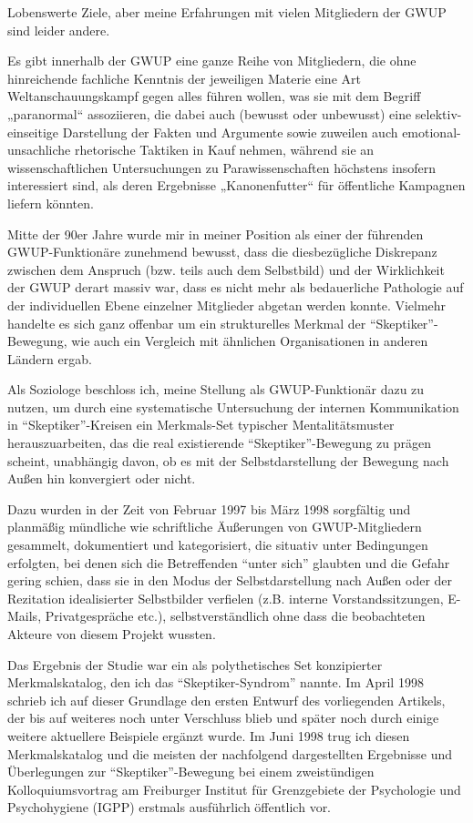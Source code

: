 Lobenswerte Ziele, aber meine Erfahrungen mit vielen Mitgliedern der
GWUP sind leider andere.

Es gibt innerhalb der GWUP eine ganze Reihe von Mitgliedern, die ohne
hinreichende fachliche Kenntnis der jeweiligen Materie eine Art
Weltanschauungskampf gegen alles führen wollen, was sie mit dem Begriff
„paranormal`` assoziieren, die dabei auch (bewusst oder unbewusst) eine
selektiv-einseitige Darstellung der Fakten und Argumente sowie zuweilen
auch emotional-unsachliche rhetorische Taktiken in Kauf nehmen, während
sie an wissenschaftlichen Untersuchungen zu Parawissenschaften höchstens
insofern interessiert sind, als deren Ergebnisse „Kanonenfutter`` für
öffentliche Kampagnen liefern könnten.

Mitte der 90er Jahre wurde mir in meiner Position als einer der
führenden GWUP-Funktionäre zunehmend bewusst, dass die diesbezügliche
Diskrepanz zwischen dem Anspruch (bzw. teils auch dem Selbstbild) und
der Wirklichkeit der GWUP derart massiv war, dass es nicht mehr als
bedauerliche Pathologie auf der individuellen Ebene einzelner Mitglieder
abgetan werden konnte. Vielmehr handelte es sich ganz offenbar um ein
strukturelles Merkmal der ``Skeptiker''-Bewegung, wie auch ein Vergleich
mit ähnlichen Organisationen in anderen Ländern ergab.

Als Soziologe beschloss ich, meine Stellung als GWUP-Funktionär dazu zu
nutzen, um durch eine systematische Untersuchung der internen
Kommunikation in ``Skeptiker''-Kreisen ein Merkmals-Set typischer
Mentalitätsmuster herauszuarbeiten, das die real existierende
``Skeptiker''-Bewegung zu prägen scheint, unabhängig davon, ob es mit
der Selbstdarstellung der Bewegung nach Außen hin konvergiert oder
nicht.

Dazu wurden in der Zeit von Februar 1997 bis März 1998 sorgfältig und
planmäßig mündliche wie schriftliche Äußerungen von GWUP-Mitgliedern
gesammelt, dokumentiert und kategorisiert, die situativ unter
Bedingungen erfolgten, bei denen sich die Betreffenden ``unter sich''
glaubten und die Gefahr gering schien, dass sie in den Modus der
Selbstdarstellung nach Außen oder der Rezitation idealisierter
Selbstbilder verfielen (z.B. interne Vorstandssitzungen, E-Mails,
Privatgespräche etc.), selbstverständlich ohne dass die beobachteten
Akteure von diesem Projekt wussten.

Das Ergebnis der Studie war ein als polythetisches Set konzipierter
Merkmalskatalog, den ich das ``Skeptiker-Syndrom'' nannte. Im April 1998
schrieb ich auf dieser Grundlage den ersten Entwurf des vorliegenden
Artikels, der bis auf weiteres noch unter Verschluss blieb und später
noch durch einige weitere aktuellere Beispiele ergänzt wurde. Im Juni
1998 trug ich diesen Merkmalskatalog und die meisten der nachfolgend
dargestellten Ergebnisse und Überlegungen zur ``Skeptiker''-Bewegung bei
einem zweistündigen Kolloquiumsvortrag am Freiburger Institut für
Grenzgebiete der Psychologie und Psychohygiene (IGPP) erstmals
ausführlich öffentlich vor.

